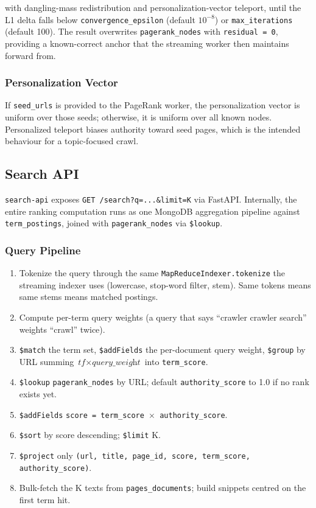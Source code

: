 \documentclass[11pt,a4paper]{article}
\newcommand{\code}[1]{\texttt{#1}}
\begin{document}
with dangling-mass redistribution and personalization-vector teleport, until the L1 delta falls below \code{convergence\_epsilon} (default $10^{-8}$) or \code{max\_iterations} (default 100). The result overwrites \code{pagerank\_nodes} with \code{residual = 0}, providing a known-correct anchor that the streaming worker then maintains forward from.

\subsubsection{Personalization Vector}

If \code{seed\_urls} is provided to the PageRank worker, the personalization vector is uniform over those seeds; otherwise, it is uniform over all known nodes. Personalized teleport biases authority toward seed pages, which is the intended behaviour for a topic-focused crawl.

\subsection{Search API}
\label{sec:search}

\code{search-api} exposes \code{GET /search?q=...\&limit=K} via FastAPI. Internally, the entire ranking computation runs as one MongoDB aggregation pipeline against \code{term\_postings}, joined with \code{pagerank\_nodes} via \code{\$lookup}.

\subsubsection{Query Pipeline}

\begin{enumerate}
  \item Tokenize the query through the same \code{MapReduceIndexer.tokenize} the streaming indexer uses (lowercase, stop-word filter, stem). Same tokens means same stems means matched postings.
  \item Compute per-term query weights (a query that says ``crawler crawler search'' weights ``crawl'' twice).
  \item \code{\$match} the term set, \code{\$addFields} the per-document query weight, \code{\$group} by URL summing $\textit{tf} \times \textit{query\_weight}$ into \code{term\_score}.
  \item \code{\$lookup} \code{pagerank\_nodes} by URL; default \code{authority\_score} to 1.0 if no rank exists yet.
  \item \code{\$addFields} \code{score = term\_score $\times$ authority\_score}.
  \item \code{\$sort} by score descending; \code{\$limit} K.
  \item \code{\$project} only \code{(url, title, page\_id, score, term\_score, authority\_score)}.
  \item Bulk-fetch the K texts from \code{pages\_documents}; build snippets centred on the first term hit.
\end{enumerate}
\end{document}
